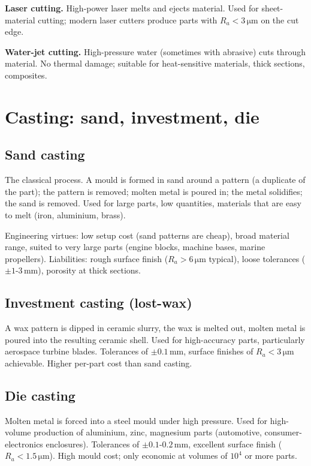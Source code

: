 \textbf{Laser cutting.} High-power laser melts and ejects material. Used for sheet-material cutting; modern laser cutters produce parts with $R_a < 3\,\si{\micro\meter}$ on the cut edge.

\textbf{Water-jet cutting.} High-pressure water (sometimes with abrasive) cuts through material. No thermal damage; suitable for heat-sensitive materials, thick sections, composites.

\section{Casting: sand, investment, die}

\subsection{Sand casting}

The classical process. A mould is formed in sand around a pattern (a duplicate of the part); the pattern is removed; molten metal is poured in; the metal solidifies; the sand is removed. Used for large parts, low quantities, materials that are easy to melt (iron, aluminium, brass).

Engineering virtues: low setup cost (sand patterns are cheap), broad material range, suited to very large parts (engine blocks, machine bases, marine propellers). Liabilities: rough surface finish ($R_a > 6\,\si{\micro\meter}$ typical), loose tolerances ($\pm 1$-$3\,\si{\milli\meter}$), porosity at thick sections.

\subsection{Investment casting (lost-wax)}

A wax pattern is dipped in ceramic slurry, the wax is melted out, molten metal is poured into the resulting ceramic shell. Used for high-accuracy parts, particularly aerospace turbine blades. Tolerances of $\pm 0.1\,\si{\milli\meter}$, surface finishes of $R_a < 3\,\si{\micro\meter}$ achievable. Higher per-part cost than sand casting.

\subsection{Die casting}

Molten metal is forced into a steel mould under high pressure. Used for high-volume production of aluminium, zinc, magnesium parts (automotive, consumer-electronics enclosures). Tolerances of $\pm 0.1$-$0.2\,\si{\milli\meter}$, excellent surface finish ($R_a < 1.5\,\si{\micro\meter}$). High mould cost; only economic at volumes of $10^4$ or more parts.

